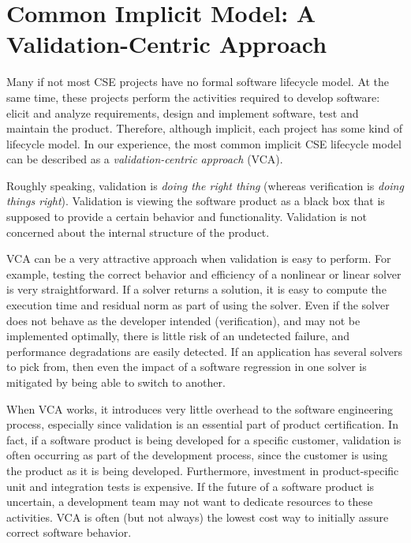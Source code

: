 \documentclass[11pt]{SANDreport}
\begin{document}
%
{}\section {Common Implicit Model: A Validation-Centric Approach} \label{sec:validation_centric_approach}

Many if not most CSE projects have no formal software lifecycle model. At the same time, these projects perform the activities required to develop software: elicit and analyze requirements, design and implement software, test and maintain the product.  Therefore, although implicit, each project has some kind of lifecycle model.  In our experience, the most common implicit CSE lifecycle model can be described as a \textit{validation-centric approach} (VCA).

Roughly speaking, validation is \textit{doing the right thing} (whereas verification is \textit{doing things right}).  Validation is viewing the software product as a black box that is supposed to provide a certain behavior and functionality.  Validation is not concerned about the internal structure of the product.

VCA can be a very attractive approach when validation is easy to perform.  For example, testing the correct behavior and efficiency of a nonlinear or linear solver is very straightforward.  If a solver returns a solution, it is easy to compute the execution time and residual norm as part of using the solver.  Even if the solver does not behave as the developer intended (verification), and may not be implemented optimally, there is little risk of an undetected failure, and performance degradations are easily detected.  If an application has several solvers to pick from, then even the impact of a software regression in one solver is mitigated by being able to switch to another.

When VCA works, it introduces very little overhead to the software engineering process, especially since validation is an essential part of product certification.  In fact, if a software product is being developed for a specific customer, validation is often occurring as part of the development process, since the customer is using the product as it is being developed.  Furthermore, investment in product-specific unit and integration tests is expensive.  If the future of a software product is uncertain, a development team may not want to dedicate resources to these activities.  VCA is often (but not always) the lowest cost way to initially assure correct software behavior.
\end{document}

